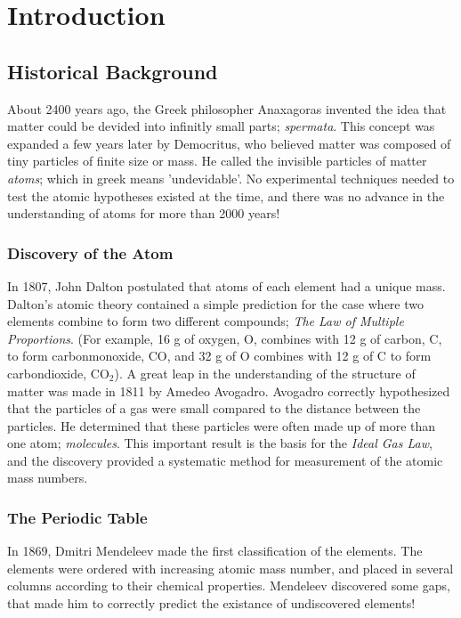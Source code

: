 \chapter{Introduction}
\label{introduction}

\section{Historical Background}

About 2400 years ago, the Greek philosopher Anaxagoras invented the
idea that matter could be devided into infinitly small parts;
\emph{spermata}. 
This concept was expanded a few years later by
Democritus, who believed matter was composed of tiny particles of
finite size or mass. He called the invisible particles of matter
\emph{atoms}; which in greek means 'undevidable'. 
No experimental techniques needed to test the atomic
hypotheses existed at the time, and there was no advance in the
understanding of atoms for more than 2000 years! 

\subsection*{Discovery of the Atom}

In 1807, John Dalton postulated that atoms of each element had a
unique mass. Dalton's atomic theory contained a simple prediction for
the case where two elements combine to form two different compounds;
\emph{The Law of Multiple Proportions}. (For example, 16 g of oxygen, O,
combines with 12 g of carbon, C, to form carbonmonoxide, CO, and
32 g of O combines with 12 g of C to form carbondioxide, CO$_2$).
%
\newline
%
A great leap in the understanding of the structure of matter was made
in 1811 by Amedeo Avogadro. Avogadro correctly hypothesized that the
particles of a gas were small compared to the distance between the
particles. He determined that these particles were often made up of
more than one atom; \emph{molecules}. This important result is the
basis for the \emph{Ideal Gas Law}, and the discovery provided a
systematic method for measurement of the atomic mass numbers.

\subsection*{The Periodic Table}

In 1869, Dmitri Mendeleev made the first classification of the
elements. The elements were ordered with increasing atomic mass
number, and placed in several columns according to their chemical
properties. Mendeleev discovered some gaps, that made him to correctly
predict the existance of undiscovered elements!


